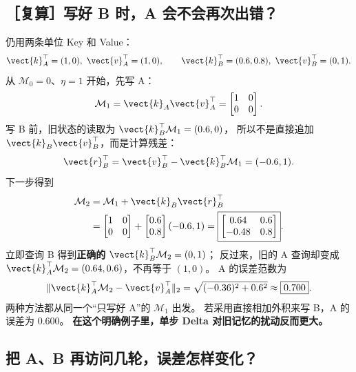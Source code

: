 \subsection{［复算］写好 B 时，A 会不会再次出错？}

仍用两条单位 Key 和 Value：
\[
\vect{k}_A^\top=(1,0),\ \vect{v}_A^\top=(1,0),\qquad
\vect{k}_B^\top=(0.6,0.8),\ \vect{v}_B^\top=(0,1).
\]
从 $\mathcal{M}_0=0$、$\eta=1$ 开始，先写 A：
\[
\mathcal{M}_1=\vect{k}_A \vect{v}_A^\top=\begin{bmatrix}1&0\\0&0\end{bmatrix}.
\]
写 B 前，旧状态的读取为 $\vect{k}_B^\top\mathcal{M}_1=(0.6,0)$，
所以不是直接追加 $\vect{k}_B \vect{v}_B^\top$，而是计算残差：
\[
\vect{r}_B^\top=\vect{v}_B^\top-\vect{k}_B^\top\mathcal{M}_1=(-0.6,1).
\]
下一步得到
\begin{equation}
\begin{aligned}
\mathcal{M}_2&=\mathcal{M}_1+\vect{k}_B \vect{r}_B^\top\\
&=\begin{bmatrix}1&0\\0&0\end{bmatrix}
+\begin{bmatrix}0.6\\0.8\end{bmatrix}(-0.6,1)
=\boxed{\begin{bmatrix}0.64&0.6\\-0.48&0.8\end{bmatrix}}.
\end{aligned}
\label{eq:delta-overwrites-key-a}
\end{equation}
立即查询 B 得到\textbf{正确的} $\vect{k}_B^\top\mathcal{M}_2=(0,1)$；
反过来，旧的 A 查询却变成
$\vect{k}_A^\top\mathcal{M}_2=(0.64,0.6)$，不再等于 $(1,0)$。
A 的误差范数为
\[
\|\vect{k}_A^\top\mathcal{M}_2-\vect{v}_A^\top\|_2=\sqrt{(-0.36)^2+0.6^2}
\approx\boxed{0.700}.
\]
两种方法都从同一个“只写好 A”的 $\mathcal{M}_1$ 出发。
若采用直接相加外积来写 B，A 的误差为 $0.600$。
\textbf{在这个明确例子里，单步 Delta 对旧记忆的扰动反而更大。}

\subsection{把 A、B 再访问几轮，误差怎样变化？}
\label{sec:delta-revisit}

